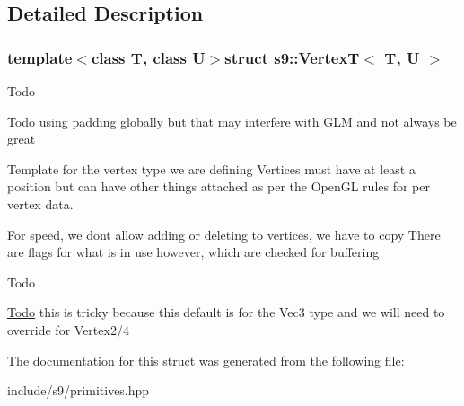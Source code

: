 \subsection{\-Detailed \-Description}
\subsubsection*{template$<$class T, class U$>$struct s9\-::\-Vertex\-T$<$ T, U $>$}

\begin{DoxyRefDesc}{\-Todo}
\item[\hyperlink{todo__todo000024}{\-Todo}]using padding globally but that may interfere with \-G\-L\-M and not always be great \end{DoxyRefDesc}
\-Template for the vertex type we are defining \-Vertices must have at least a position but can have other things attached as per the \-Open\-G\-L rules for per vertex data.

\-For speed, we dont allow adding or deleting to vertices, we have to copy \-There are flags for what is in use however, which are checked for buffering\begin{DoxyRefDesc}{\-Todo}
\item[\hyperlink{todo__todo000025}{\-Todo}]this is tricky because this default is for the \-Vec3 type and we will need to override for \-Vertex2/4 \end{DoxyRefDesc}


\-The documentation for this struct was generated from the following file\-:\begin{DoxyCompactItemize}
\item 
include/s9/primitives.\-hpp\end{DoxyCompactItemize}
